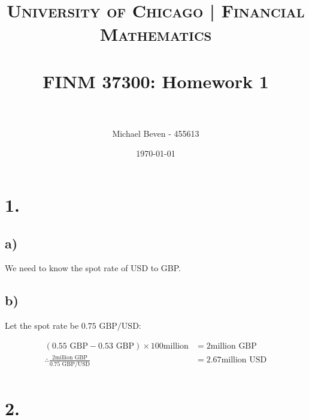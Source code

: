 \documentclass[paper=a4, fontsize=11pt]{scrartcl} %
\title{	
\normalfont \normalsize 
\textsc{University of Chicago | Financial Mathematics} \\ [25pt] %
\horrule{0.5pt} \\[0.4cm] %
\huge FINM 37300: Homework 1 \\ %
\horrule{2pt} \\[0.5cm] %
}
\author{Michael Beven - 455613} %
\date{\normalsize\today} %
\numberwithin{equation}{section} %
\numberwithin{figure}{section} %
\numberwithin{table}{section} %
\begin{document}
\maketitle %


\section*{1.}


\subsection*{a)}

We need to know the spot rate of USD to GBP.


\subsection*{b)}

Let the spot rate be $0.75 \text{ GBP}/ \text{USD}$:

\begin{align*}
(0.55 \text{ GBP} - 0.53 \text{ GBP})\times 100\text{million} &= 2\text{million GBP}\\
\therefore \frac{2\text{million GBP}}{0.75 \text{ GBP}/ \text{USD}} &= 2.67\text{million USD}\\
\end{align*}


\section*{2.}
\end{document}

